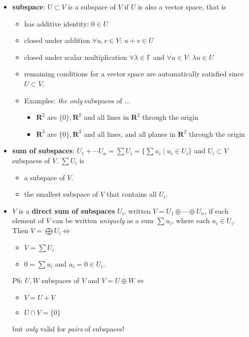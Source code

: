 \documentclass[11pt,notitlepage,oneside]{article}
\begin{document}
\begin{itemize}
\item \textbf{subspace}: $U\subset V$ is a subspace of $V$ if $U$ is also a vector space, that is
\begin{itemize}
\item has additive identity: $0\in U$
\item closed under addition $\forall u,v \in V$: $u+v \in U$ 
\item closed under scalar multiplication $\forall \lambda\in \mathbb{F}$ and $\forall u \in V$: $\lambda u \in U$  
\item remaining conditions for a vector space are automatically satisfied since $U\subset V$.
\item Examples: \emph{the only} subspaces of ...
\begin{itemize}
  \item $\mathbf{R}^2$ are $\{0\}, \mathbf{R}^2$ and all lines in $\mathbf{R}^2$ through the origin
  \item $\mathbf{R}^3$ are $\{0\}, \mathbf{R}^3$ and all lines, and all planes in $\mathbf{R}^2$ through the origin
\end{itemize}

\end{itemize} 

\item \textbf{sum of subspaces}: $U_1+\cdots U_n = \sum U_i =\{\sum u_i\mid u_i\in U_i\}$ and $U_i\subset V$ subspaces of $V$. $\sum U_i$ is
\begin{itemize}
\item a subspace of $V$.
\item the smallest subspace of $V$ that contains all $U_i$.
\end{itemize}

\item $V$ is a \textbf{direct sum of subspaces} $U_i$, written $V=U_1\oplus\cdots\oplus U_n$, if each element of $V$ can be written \emph{uniquely} as a sum $\sum u_i$, where each $u_i\in U_i$. 
Then $V=\bigoplus U_i \iff$
\begin{itemize}
\item $V = \sum U_i$
\item $0=\sum u_i$ and $u_i=0 \in U_i$.
\end{itemize}

\item[P6:\label{it:P1_6}] $U,W$ subspaces of $V$ and $V=U\oplus W \iff$
\begin{itemize}
\item $V=U+V$
\item $U\cap V=\{0\}$
\end{itemize}
but \emph{only} valid for \emph{pairs} of subspaces!

\end{itemize}
\end{document}
